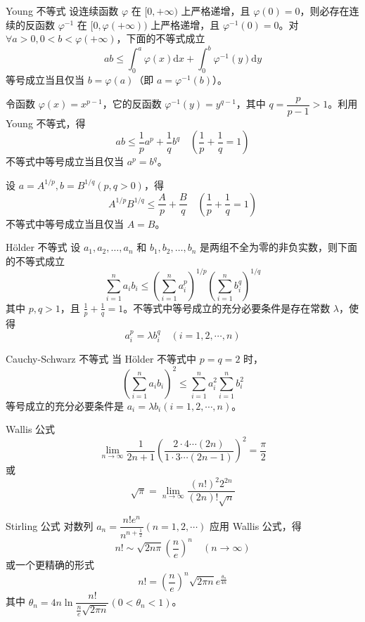 \begin{theorem}{Young 不等式}
    设连续函数 $\varphi$ 在 $[0, +\infty)$ 上严格递增，且 $\varphi(0) = 0$，则必存在连续的反函数 $\varphi^{-1}$ 在 $[0, \varphi(+\infty))$ 上严格递增，且 $\varphi^{-1}(0) = 0$。对 $\forall a > 0, 0 < b < \varphi(+\infty)$，下面的不等式成立
    \[ab \leqslant \int_{0}^{a}\varphi(x)\mathrm{d}x + \int_{0}^{b}\varphi^{-1}(y)\mathrm{d}y\]
    等号成立当且仅当 $b = \varphi(a)$（即 $a = \varphi^{-1}(b)$）。
\end{theorem}

令函数 $\varphi(x) = x^{p - 1}$，它的反函数 $\varphi^{-1}(y) = y^{q - 1}$，其中 $q = \dfrac{p}{p - 1} > 1$。利用 Young 不等式，得
\[ab \leqslant \frac{1}{p}a^p + \frac{1}{q}b^q \quad (\frac{1}{p} +\frac{1}{q} = 1)\]
不等式中等号成立当且仅当 $a^p = b^q$。

设 $a = A^{1/p}, b = B^{1/q} (p, q > 0)$，得
\[A^{1/p}B^{1/q} \leqslant \frac{A}{p} + \frac{B}{q} \quad (\frac{1}{p} +\frac{1}{q} = 1)\]
不等式中等号成立当且仅当 $A = B$。

\begin{theorem}{Hölder 不等式}
    设 $a_1, a_2, \ldots ,a_n$ 和 $b_1, b_2, \ldots ,b_n$ 是两组不全为零的非负实数，则下面的不等式成立
    \[\sum_{i = 1}^{n}a_{i}b_{i} \leqslant \left(\sum_{i = 1}^{n}a_{i}^{p}\right)^{1/p}\left(\sum_{i = 1}^{n}b_{i}^{q}\right)^{1/q}\]
    其中 $p, q > 1$，且 $\frac{1}{p} + \frac{1}{q} = 1$。不等式中等号成立的充分必要条件是存在常数 $\lambda$，使得
    \[a_{i}^{p} = \lambda b_{i}^{q}\quad (i = 1,2,\cdots,n)\]
\end{theorem}

\begin{theorem}{Cauchy-Schwarz 不等式}
    当 Hölder 不等式中 $p = q = 2$ 时，
    \[\left(\sum_{i = 1}^{n}a_{i}b_{i}\right)^2 \leqslant \sum_{i = 1}^{n}a_{i}^{2}\sum_{i = 1}^{n}b_{i}^{2}\]
    等号成立的充分必要条件是 $a_i = \lambda b_i(i = 1,2,\cdots,n)$。
\end{theorem}

\begin{theorem}{Wallis 公式}
    \[\lim_{n \to \infty}\frac{1}{2n + 1}\left(\frac{2 \cdot 4 \cdots (2n)}{1 \cdot 3 \cdots (2n - 1)}\right)^2 = \frac{\pi}{2}\]
    或
    \[\sqrt{\pi} = \lim_{n \to \infty}\frac{(n!)^{2}2^{2n}}{(2n)!\sqrt{n}}\]
\end{theorem}

\begin{theorem}{Stirling 公式}
    对数列 $a_n = \dfrac{n!e^n}{n^{n + \frac{1}{2}}}(n = 1,2, \cdots )$ 应用 Wallis 公式，得
    \[n! \sim \sqrt{2n\pi}\left(\frac{n}{e}\right)^n \quad (n \to \infty)\]
    或一个更精确的形式
    \[n! = \left(\frac{n}{e}\right)^{n}\sqrt{2\pi n}e^{\frac{\theta_n}{4n}}\]
    其中 $\theta_n = 4n \ln\dfrac{n!}{\frac{n}{e}\sqrt{2\pi n}}(0 < \theta_n < 1)$。
\end{theorem}
